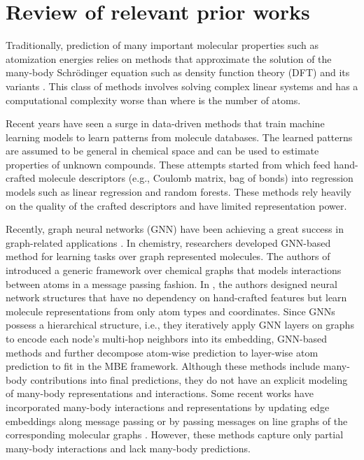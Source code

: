 \documentclass[conference]{IEEEtran}
\begin{document}
\section{Review of relevant prior works}

Traditionally, prediction of many important molecular properties such as atomization energies relies on methods that approximate the solution of the many-body Schr\"{o}dinger equation such as density function theory (DFT) and its variants \cite{DFT}. This class of methods involves solving complex linear systems and has a computational complexity worse than  where  is the number of atoms. 

Recent years have seen a surge in data-driven methods that train machine learning models to learn patterns from molecule databases. The learned patterns are assumed to be general in chemical space and can be used to estimate properties of unknown compounds. These attempts started from \cite{faber2017machine, bartok2017machine} which feed hand-crafted molecule descriptors (e.g., Coulomb matrix, bag of bonds) into regression models such as linear regression and random forests. These methods rely heavily on the quality of the crafted descriptors and have limited representation power. 

Recently, graph neural networks (GNN) have been achieving a great success in graph-related applications \cite{GCN, GAT, SAGE, DiffPool}. In chemistry, researchers developed GNN-based method for learning tasks over graph represented molecules. The authors of \cite{MPNN} introduced a generic framework over chemical graphs that models interactions between atoms in a message passing fashion. In \cite{DTNN, SchNet-1, SchNet-2}, the authors designed neural network structures that have no dependency on hand-crafted features but learn molecule representations from only atom types and coordinates. Since GNNs possess a hierarchical structure, i.e., they iteratively apply GNN layers on graphs to encode each node's multi-hop neighbors into its embedding, GNN-based methods \cite{HIP-NN} and \cite{unke2019physnet} further decompose atom-wise prediction to layer-wise atom prediction to fit in the MBE framework. Although these methods include many-body contributions into final predictions, they do not have an explicit modeling of many-body representations and interactions. Some recent works have incorporated many-body interactions and representations by updating edge embeddings along message passing \cite{NMP-edge} or by passing messages on line graphs of the corresponding molecular graphs \cite{DimeNet}. However, these methods capture only partial many-body interactions and lack many-body predictions.
\end{document}
